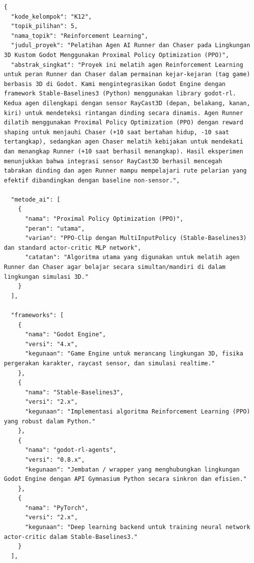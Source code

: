 \documentclass[12pt,a4paper]{article}
\begin{document}
\begin{verbatim}
{
  "kode_kelompok": "K12",
  "topik_pilihan": 5,
  "nama_topik": "Reinforcement Learning",
  "judul_proyek": "Pelatihan Agen AI Runner dan Chaser pada Lingkungan 3D Kustom Godot Menggunakan Proximal Policy Optimization (PPO)",
  "abstrak_singkat": "Proyek ini melatih agen Reinforcement Learning untuk peran Runner dan Chaser dalam permainan kejar-kejaran (tag game) berbasis 3D di Godot. Kami mengintegrasikan Godot Engine dengan framework Stable-Baselines3 (Python) menggunakan library godot-rl. Kedua agen dilengkapi dengan sensor RayCast3D (depan, belakang, kanan, kiri) untuk mendeteksi rintangan dinding secara dinamis. Agen Runner dilatih menggunakan Proximal Policy Optimization (PPO) dengan reward shaping untuk menjauhi Chaser (+10 saat bertahan hidup, -10 saat tertangkap), sedangkan agen Chaser melatih kebijakan untuk mendekati dan menangkap Runner (+10 saat berhasil menangkap). Hasil eksperimen menunjukkan bahwa integrasi sensor RayCast3D berhasil mencegah tabrakan dinding dan agen Runner mampu mempelajari rute pelarian yang efektif dibandingkan dengan baseline non-sensor.",

  "metode_ai": [
    {
      "nama": "Proximal Policy Optimization (PPO)",
      "peran": "utama",
      "varian": "PPO-Clip dengan MultiInputPolicy (Stable-Baselines3) dan standard actor-critic MLP network",
      "catatan": "Algoritma utama yang digunakan untuk melatih agen Runner dan Chaser agar belajar secara simultan/mandiri di dalam lingkungan simulasi 3D."
    }
  ],

  "frameworks": [
    {
      "nama": "Godot Engine",
      "versi": "4.x",
      "kegunaan": "Game Engine untuk merancang lingkungan 3D, fisika pergerakan karakter, raycast sensor, dan simulasi realtime."
    },
    {
      "nama": "Stable-Baselines3",
      "versi": "2.x",
      "kegunaan": "Implementasi algoritma Reinforcement Learning (PPO) yang robust dalam Python."
    },
    {
      "nama": "godot-rl-agents",
      "versi": "0.8.x",
      "kegunaan": "Jembatan / wrapper yang menghubungkan lingkungan Godot Engine dengan API Gymnasium Python secara sinkron dan efisien."
    },
    {
      "nama": "PyTorch",
      "versi": "2.x",
      "kegunaan": "Deep learning backend untuk training neural network actor-critic dalam Stable-Baselines3."
    }
  ],


\end{verbatim}
\end{document}
